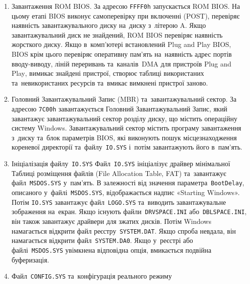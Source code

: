 \documentclass[
	a4paper,
	oneside,
	DIV = 14,
	fontsize = 14pt,
	headings = normal,
]{scrartcl}
\newcommand{\filename}[1]{\texttt{\textenglish{#1}}}
\begin{document}
		\begin{enumerate}
			\item Завантаження \textenglish{ROM BIOS}. За адресою \texttt{FFFF0h} запускається \textenglish{ROM BIOS}. На цьому етапі \textenglish{BIOS} виконує самоперевірку при включенні (\textenglish{POST}), перевіряє наявність завантажувального диску на~диску з~літерою A. Якщо завантажувальний диск не знайдений, \textenglish{ROM BIOS} перевіряє наявність жорсткого диску. Якщо в~комп'ютері встановлений \textenglish{Plug and Play BIOS}, \textenglish{BIOS} крім цього перевіряє оперативну пам'ять на~наявність адрес портів вводу-виводу, ліній переривань та~каналів~\textenglish{DMA} для пристроїв \textenglish{Plug and Play}, вимикає знайдені пристрої, створює таблиці використаних та~невикористаних ресурсів та~вмикає вимкнені пристрої заново.
			\item Головний Завантажувальний Запис (\textenglish{MBR}) та~завантажувальний сектор. За адресою \texttt{7C00h} завантажується Головний Завантажувальний Запис, який завантажує завантажувальний сектор розділу диску, що містить операційну систему \textenglish{Windows}. Завантажувальний сектор містить програму завантаження з~диску та~блок параметрів \textenglish{BIOS}, які виконують пошук місцезнаходження кореневої директорії та~файлу~\filename{IO.SYS} і~потім завантажують його в~пам'ять.
			\item Ініціалізація файлу~\filename{IO.SYS}
				Файл~\filename{IO.SYS} ініціалізує драйвер мінімальної Таблиці розміщення файлів (\textenglish{File Allocation Table, FAT}) та~завантажує файл~\filename{MSDOS.SYS} у~пам'ять. В залежності від значення параметра~\texttt{BootDelay}, описаного у~файлі~\filename{MSDOS.SYS}, відображається надпис «\textenglish{Starting Windows}». Потім \filename{IO.SYS} завантажує файл~\filename{LOGO.SYS} та~виводить завантажувальне зображення на~екран. Якщо існують файли~\filename{DRVSPACE.INI} або~\filename{DBLSPACE.INI}, він також завантажує драйвери для зжатих дисків. Потім \textenglish{Windows} намагається відкрити файл реєстру~\filename{SYSTEM.DAT}. Якщо спроба невдала, він намагається відкрити файл~\filename{SYSTEM.DA0}. Якщо у~реєстрі або файлі~\filename{MSDOS.SYS} увімкнена відповідна опція, вмикається подвійна буферизація.
			\item Файл~\filename{CONFIG.SYS} та~конфігурація реального режиму

\end{enumerate}
\end{document}
